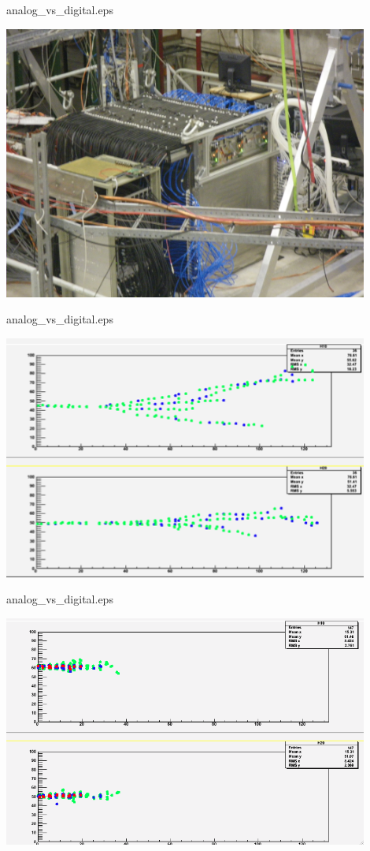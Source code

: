 \begin{frame}{analog\_vs\_digital.eps}
  \centerline{\includegraphics[width=0.9\textwidth]{images/1m3Photo}}
\end{frame}
\begin{frame}{analog\_vs\_digital.eps}
  \centerline{\includegraphics[width=0.9\textwidth]{images/10GevPion}}
\end{frame}
\begin{frame}{analog\_vs\_digital.eps}
  \centerline{\includegraphics[width=0.9\textwidth]{images/10GevElectron}}
\end{frame}
